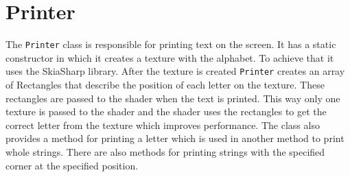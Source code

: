 \section{Printer}

The \texttt{Printer} class is responsible for printing text on the screen.
It has a static constructor in which it creates a texture with the alphabet.
To achieve that it uses the SkiaSharp library.
After the texture is created \texttt{Printer} creates an array of Rectangles that describe the position of each letter on the texture.
These rectangles are passed to the shader when the text is printed.
This way only one texture is passed to the shader and the shader uses the rectangles to get the correct letter from the texture which improves performance.
The class also provides a method for printing a letter which is used in another method to print whole strings.
There are also methods for printing strings with the specified corner at the specified position.